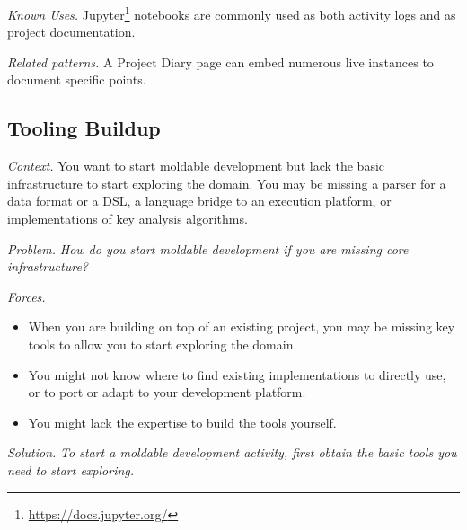 \documentclass[acmsmall,screen,authorversion,nonacm]{acmart} %
\newcommand\kh[1]{\nbc{Konrad}{#1}{violet}}
\newcommand\cp[1]{\nbe{Cesare}{#1}{olive}} %
\newcommand\dd[1]{\nbe{Daniel}{#1}{magenta}} %
\newcommand{\pattern}[2]{\needlines{10}
\subsection*{#1}\label{pat:#2}}
\newcommand{\patref}[1]{\emph{\nameref{pat:#1}}\xspace}
\newcommand{\patsec}[1]{\noindent\textit{#1.}\xspace}
\begin{document}
\patsec{Known Uses}
Jupyter\footnote{\href{https://web.archive.org/web/20240820082136/https://docs.jupyter.org/en/latest/}{https://docs.jupyter.org/}} notebooks are commonly used as both activity logs and as project documentation.

\patsec{Related patterns}
A Project Diary page can embed numerous live \patref{ExampleObject} instances to document specific points.

\pattern{Tooling Buildup}{ToolingBuildup}


\patsec{Context}
You want to start moldable development but lack the basic infrastructure 
to start exploring the domain.
You may be missing a parser for a data format or a DSL, a language bridge to an execution platform, or implementations of key analysis algorithms. 

\patsec{Problem}
\emph{How do you start moldable development if you are missing core infrastructure?}

\patsec{Forces}
\begin{itemize}[---]
\item When you are building on top of an existing project, you may be missing key tools to allow you to start exploring the domain.
\item You might not know where to find existing implementations to directly use, or to port or adapt to your development platform.
\item You might lack the expertise to build the tools yourself.
\end{itemize}

\patsec{Solution}
\emph{To start a moldable development activity, first obtain the basic tools you need to start exploring.}
\end{document}
